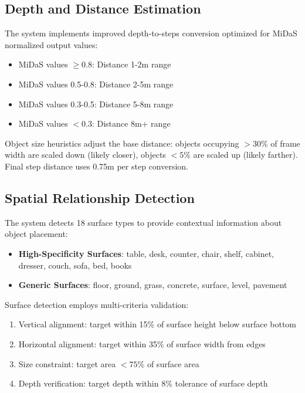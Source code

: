 \documentclass{article}
\begin{document}
\subsection{Depth and Distance Estimation}

The system implements improved depth-to-steps conversion optimized for MiDaS normalized output values:

\begin{itemize}
    \item MiDaS values $\geq 0.8$: Distance 1-2m range
    \item MiDaS values 0.5-0.8: Distance 2-5m range
    \item MiDaS values 0.3-0.5: Distance 5-8m range
    \item MiDaS values $< 0.3$: Distance 8m+ range
\end{itemize}

Object size heuristics adjust the base distance: objects occupying $> 30\%$ of frame width are scaled down (likely closer), objects $< 5\%$ are scaled up (likely farther). Final step distance uses 0.75m per step conversion.

\subsection{Spatial Relationship Detection}

The system detects 18 surface types to provide contextual information about object placement:

\begin{itemize}
    \item \textbf{High-Specificity Surfaces}: table, desk, counter, chair, shelf, cabinet, dresser, couch, sofa, bed, books
    \item \textbf{Generic Surfaces}: floor, ground, grass, concrete, surface, level, pavement
\end{itemize}

Surface detection employs multi-criteria validation:
\begin{enumerate}
    \item Vertical alignment: target within 15\% of surface height below surface bottom
    \item Horizontal alignment: target within 35\% of surface width from edges
    \item Size constraint: target area $< 75\%$ of surface area
    \item Depth verification: target depth within 8\% tolerance of surface depth
\end{enumerate}
\end{document}
